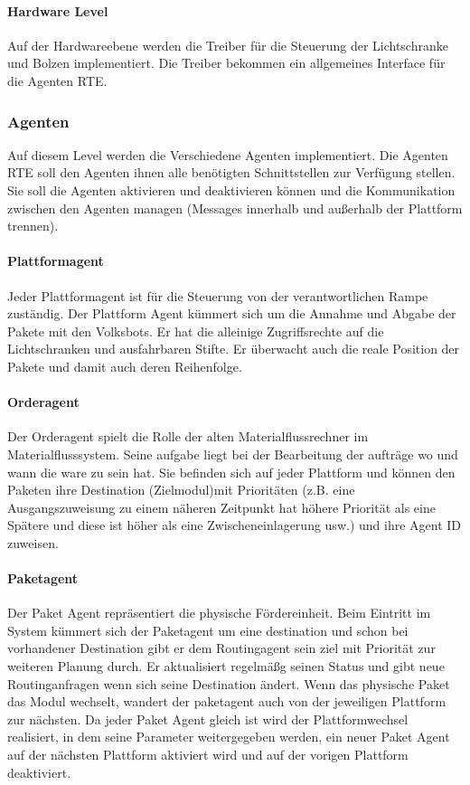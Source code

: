 \paragraph{Hardware Level}
Auf der Hardwareebene werden die Treiber für die Steuerung der Lichtschranke und Bolzen implementiert. Die Treiber bekommen ein
allgemeines Interface für die Agenten RTE.
\subsubsection{Agenten}
Auf diesem Level werden die Verschiedene Agenten implementiert. Die Agenten RTE soll den Agenten ihnen alle benötigten Schnittstellen zur
Verfügung stellen. Sie soll die Agenten aktivieren und deaktivieren können und die Kommunikation zwischen den Agenten managen
(Messages innerhalb und außerhalb der Plattform trennen)\cite[S. 26]{Stasch:Hahn}. 
\paragraph{Plattformagent}
Jeder Plattformagent ist für die Steuerung von der verantwortlichen Rampe zuständig.
Der Plattform Agent kümmert sich um die Annahme und Abgabe der Pakete mit den Volksbots. Er
hat die alleinige Zugriffsrechte auf die Lichtschranken und ausfahrbaren Stifte. Er überwacht auch die reale Position 
der Pakete und damit auch deren Reihenfolge.
\paragraph{Orderagent}
Der Orderagent spielt die Rolle der alten Materialflussrechner im Materialflusssystem. Seine aufgabe liegt bei der Bearbeitung der aufträge
wo und wann die ware zu sein hat. Sie befinden sich auf jeder Plattform und können den Paketen ihre Destination (Zielmodul)mit Prioritäten (z.B.
eine Ausgangszuweisung zu einem näheren Zeitpunkt hat höhere Priorität als eine Spätere und diese ist höher als eine Zwischeneinlagerung usw.) 
und ihre Agent ID zuweisen\cite[S. 30]{Stasch:Hahn}. 
\paragraph{Paketagent}
Der Paket Agent repräsentiert die physische Fördereinheit. Beim Eintritt im System kümmert sich der Paketagent um 
eine destination und schon bei vorhandener Destination gibt er dem Routingagent sein ziel mit Priorität zur weiteren Planung durch.
Er aktualisiert regelmäßg seinen Status und gibt neue Routinganfragen wenn sich seine Destination ändert.
Wenn das physische Paket das Modul wechselt, wandert der paketagent auch von der jeweiligen Plattform zur nächsten. 
Da jeder Paket Agent gleich ist wird der Plattformwechsel realisiert, in dem seine Parameter weitergegeben
werden, ein neuer Paket Agent auf der nächsten Plattform aktiviert wird und auf der vorigen Plattform deaktiviert\cite[S. 31]{Stasch:Hahn}.
